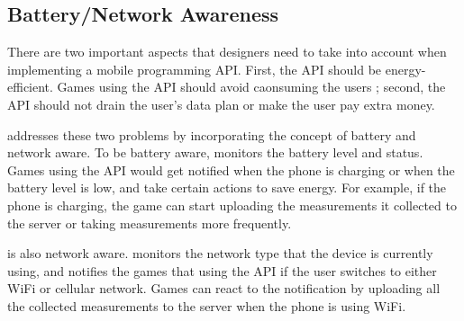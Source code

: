 \subsection{Battery/Network Awareness}
There are two important aspects that designers need to take into account when implementing a mobile 
programming API. First, the API should be energy-efficient. 
Games using the API should avoid caonsuming the users ; second, the API should
not drain the user's data plan or make the user pay extra money. 
 
\name{} addresses these two problems by incorporating the concept of battery and network aware. 
To be battery aware, \name{} monitors the battery level and status. Games using the API would get
notified when the phone is charging or when the battery level is low, and take certain actions
to save energy. For example, if the phone is charging, the game can start uploading the measurements 
it collected to the server or taking measurements more frequently. 

\name{} is also network aware. \name{} monitors the network type that the device is currently using, 
and notifies the games that using the API if the user switches to either WiFi or cellular network.
Games can react to the notification by uploading all the collected measurements to the server when
the phone is using WiFi.

